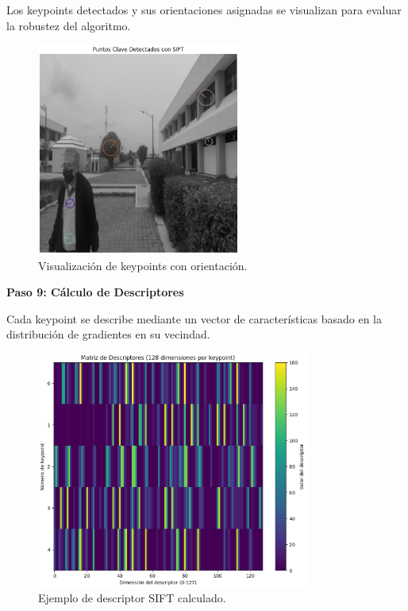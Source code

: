 \documentclass[a4paper]{article}
\begin{document}
Los keypoints detectados y sus orientaciones asignadas se visualizan para evaluar la robustez del algoritmo.

\begin{figure}[H]
    \centering
    \includegraphics[width=0.6\textwidth]{images/sift_paso_7.1.png}
    \caption{Visualización de keypoints con orientación.}
\end{figure}

\textbf{Paso 9: Cálculo de Descriptores}
\par\vspace{0.5cm}

Cada keypoint se describe mediante un vector de características basado en la distribución de gradientes en su vecindad.

\begin{figure}[H]
    \centering
    \includegraphics[width=0.8\textwidth]{images/sift_paso_8.png}
    \caption{Ejemplo de descriptor SIFT calculado.}
\end{figure}
\end{document}
